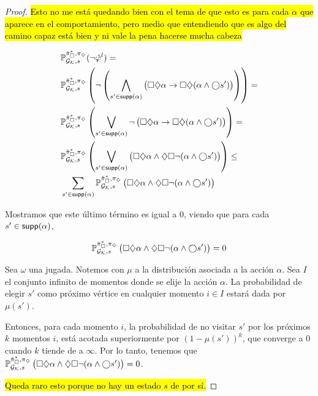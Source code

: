 \begin{proof}
	\hl{Esto no me está quedando bien con el tema de que esto es para cada $\alpha$ que aparece en el comportamiento, pero medio que entendiendo que es algo del camino capaz está bien y ni vale la pena hacerse mucha cabeza}

	\begin{align*}
		&\mathbb{P}_{\mathcal{G}_{\mathcal{K}}, s}^{\hat{\pi}_{\square}^{*}, \pi_\diamondsuit}(\neg \hat{\varphi}^l) = \\
		&\mathbb{P}_{\mathcal{G}_{\mathcal{K}}, s}^{\hat{\pi}_{\square}^{*}, \pi_\diamondsuit}\left(\neg \left(\bigwedge_{s' \in \textsf{supp}(\alpha)} \left( \square \diamondsuit \alpha \rightarrow \square \diamondsuit (\alpha \wedge \bigcirc s' ) \right)\right)\right) = \\
		&\mathbb{P}_{\mathcal{G}_{\mathcal{K}}, s}^{\hat{\pi}_{\square}^{*}, \pi_\diamondsuit} \left(\bigvee_{s' \in \textsf{supp}(\alpha)} \neg \left( \square \diamondsuit \alpha \rightarrow \square \diamondsuit (\alpha \wedge \bigcirc s' ) \right)\right) = \\
		&\mathbb{P}_{\mathcal{G}_{\mathcal{K}}, s}^{\hat{\pi}_{\square}^{*}, \pi_\diamondsuit} \left(\bigvee_{s' \in \textsf{supp}(\alpha)} \left( \square \diamondsuit \alpha \wedge \diamondsuit \square \neg (\alpha \wedge \bigcirc s' ) \right)\right) \leq \\
		&\sum_{s' \in \textsf{supp}(\alpha)} \mathbb{P}_{\mathcal{G}_{\mathcal{K}}, s}^{\hat{\pi}_{\square}^{*}, \pi_\diamondsuit} \left( \square \diamondsuit \alpha \wedge \diamondsuit \square \neg (\alpha \wedge \bigcirc s' ) \right)
	\end{align*}

	Mostramos que este último término es igual a 0, viendo que para cada $s' \in
		\textsf{supp}(\alpha)$,

	$$
		\mathbb{P}_{\mathcal{G}_{\mathcal{K}}, s}^{\hat{\pi}_{\square}^{*}, \pi_\diamondsuit} \left( \square \diamondsuit \alpha \wedge \diamondsuit \square \neg (\alpha \wedge \bigcirc s' ) \right) = 0
	$$

	Sea $\omega$ una jugada. Notemos con $\mu$ a la distribución asociada a la
	acción $\alpha$. Sea $I$ el conjunto infinito de momentos donde se elije la
	acción $\alpha$. La probabilidad de elegir $s'$ como próximo vértice en
	cualquier momento $i \in I$ estará dada por $\mu(s')$.

	Entonces, para cada momento $i$, la probabilidad de no visitar $s'$ por los
	próximos $k$ momentos $i$, está acotada superiormente por $(1 - \mu(s'))^k$,
	que converge a $0$ cuando $k$ tiende de a $\infty$. Por lo tanto, tenemos que
	$\mathbb{P}_{\mathcal{G}_{\mathcal{K}}, s}^{\hat{\pi}_{\square}^{*}, \pi_\diamondsuit} \left( \square \diamondsuit \alpha \wedge
		\diamondsuit \square \neg (\alpha \wedge \bigcirc s' ) \right) = 0$.

	\hl{Queda raro esto porque no hay un estado $s$ de por sí.}

\end{proof}
